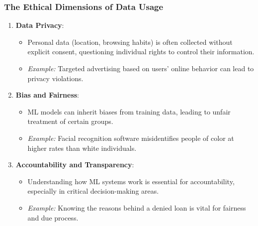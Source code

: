 \documentclass[aspectratio=169]{beamer}
\begin{document}
\begin{frame}[fragile]
    \frametitle{The Ethical Dimensions of Data Usage}
    \begin{enumerate}
        \item \textbf{Data Privacy}:
        \begin{itemize}
            \item Personal data (location, browsing habits) is often collected without explicit consent, questioning individual rights to control their information.
            \item \textit{Example:} Targeted advertising based on users' online behavior can lead to privacy violations.
        \end{itemize}
        
        \item \textbf{Bias and Fairness}:
        \begin{itemize}
            \item ML models can inherit biases from training data, leading to unfair treatment of certain groups.
            \item \textit{Example:} Facial recognition software misidentifies people of color at higher rates than white individuals.
        \end{itemize}

        \item \textbf{Accountability and Transparency}:
        \begin{itemize}
            \item Understanding how ML systems work is essential for accountability, especially in critical decision-making areas.
            \item \textit{Example:} Knowing the reasons behind a denied loan is vital for fairness and due process.
        \end{itemize}
    \end{enumerate}
\end{frame}
\end{document}
